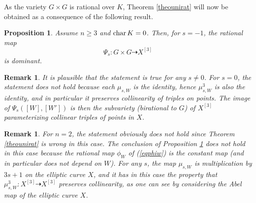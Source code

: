 \documentclass[10pt]{article}
\newtheorem{prop}[theo]{Proposition}
\newtheorem{rema}[theo]{Remark}
\begin{document}
As the variety $G\times G$ is rational over $K$, Theorem \ref{theounirat} will now be obtained as a consequence of the following  result.
\begin{prop}\label{prodominant}  Assume $n\geq 3$ and ${\rm char}\,K=0$. Then, for  $s=-1$, the rational map
$$\Psi_s: G\times G\dashrightarrow X^{[3]}$$
is dominant.
\end{prop}
\begin{rema}{\rm It is plausible that the statement is true for any $s\not=0$. For $s=0$, the statement does not hold because each $\mu_{s,W}$ is the identity, hence $\mu_{s,W}^3$ is also the identity, and in particular it preserves collinearity of triples on points. The image of $\Psi_s([W],[W'])$ is then  the subvariety (birational to $G$) of $X^{[3]}$ parameterizing  collinear triples of points in $X$.}
\end{rema}
\begin{rema}{\rm For $n=2$, the statement obviously does not hold since Theorem \ref{theounirat} is wrong in this case.  The conclusion of Proposition \ref{prodominant} does not hold in this case because  the rational map $\phi_W$ of (\ref{eqphiw}) is the constant map (and in particular does not depend on $W$). For any $s$,  the map $\mu_{s,W}$ is multiplication by $3s+1$ on the elliptic curve $X$, and  it has in this case the property that $\mu_{s,W}^3: X^{[3]}\dashrightarrow X^{[3]}$ preserves collinearity, as one can see by considering the Abel map of the elliptic curve $X$.}
\end{rema}
\end{document}
